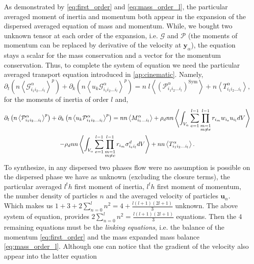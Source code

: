 {As demonstrated by \ref{eq:first_order} and \ref{eq:mass_order_l}, the particular averaged moment of inertia and momentum both appear in the expansion of the dispersed averaged equation of mass and momentum.
While, we bought two unknown tensor at each order of the expansion, i.e. $\mathcal{G}$ and  $\mathcal{P}$ (the moments of momentum can be replaced by derivative of the velocity at $\bm{y}_\alpha$), the equation stays a scalar for the mass conservation and a vector for the momentum conservation.
Thus, to complete the system of equation we need the particular averaged transport equation introduced in \ref{ap:cinematic}.
Namely,
\begin{equation*}
    \partial_t\left(n\left<\mathcal{G}_{i_1i_2\ldots i_l}^\alpha\right>^p\right)
    +\partial_k\left(n\left<u_k\mathcal{G}_{i_1i_2\ldots i_l}^\alpha\right>^p\right)
    = n\;l\left<(\mathcal{P}^\alpha_{i_1i_2\ldots i_l})^\text{Sym}\right>
    +n\left<T^\alpha_{i_1i_2\ldots i_l}\right>,
\end{equation*}
for the moments of inertia of order $l$ and,
\begin{multline*}
    \partial_t\left(n\left<\mathcal{P}_{i_1i_2\ldots i_l}^\alpha\right>^p\right)
    +\partial_k\left(n\left<u_k\mathcal{P}_{i_1i_2\ldots i_l}^\alpha\right>^p\right)
    =
    nn \left<M^\alpha_{i_1\ldots i_l}\right>
    +\rho_d n n \left< \int_{V_\alpha} \sum_{e=1}^{l-1}  \prod^{l-1}_{\substack{ m=1 \\   m \neq e}} r_{i_m} w_{i_e} u_{i_l}dV\right>\\
    -\rho_d n n \left<\int_{V_\alpha} \sum^{l-1}_{e=1} \prod^{l-1}_{\substack{m=1\\ m\neq e}}r_{i_m}  \sigma_{i_ei_l}^d dV\right>
    + n n \left<T^\alpha_{i_1i_2\ldots i_l}\right>.
\end{multline*}
To synthesize, in any dispersed two phases flow were no assumption is possible on the dispersed phase we have as unknown (excluding the closure terms), the particular averaged $l^th$ first moment of inertia, $l^th$ first moment of momentum, the number density of particles  $n$ and the averaged velocity of particles $\bm{u}_\alpha$. 
Which makes us $1+3+2\sum_{n=0}^l n^2 = 4+\frac{l(l+1)(2l+1)}{3}$ unknown. 
The above system of equation, provides $2\sum_{n=0}^l n^2 = \frac{l(l+1)(2l+1)}{3}$ equations. 
Then the $4$ remaining equations must be the \textit{linking equations}, i.e. the balance of the momentum \ref{eq:first_order} and the mass expanded mass balance \ref{eq:mass_order_l}.
Although one can notice that the gradient of the velocity also appear into the latter equation 


}
